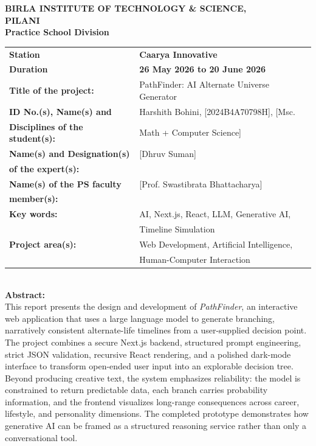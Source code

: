 \documentclass[12pt,a4paper]{report}
\begin{document}
\newpage
\begin{center}
    {\large \textbf{BIRLA INSTITUTE OF TECHNOLOGY \& SCIENCE,}}\\
    {\large \textbf{PILANI}}\\
    {\large \textbf{Practice School Division}}
\end{center}
\vspace{1cm}
\noindent
\begin{tabular}{@{}p{}p{}@{}}
\textbf{Station} & \textbf{Caarya Innovative} \\[0.5cm]
\textbf{Duration} & \textbf{26 May 2026 to 20 June 2026} \\[0.5cm]
\textbf{Title of the project:} & PathFinder: AI Alternate Universe Generator \\[0.5cm]
\textbf{ID No.(s), Name(s) and} & Harshith Bohini, [2024B4A70798H], [Msc. \\
\textbf{Disciplines of the student(s):} & Math + Computer Science] \\[0.5cm]
\textbf{Name(s) and Designation(s)} & [Dhruv Suman] \\
\textbf{of the expert(s):} & \\[0.5cm]
\textbf{Name(s) of the PS faculty} & [Prof. Swastibrata Bhattacharya] \\
\textbf{member(s):} & \\[0.5cm]
\textbf{Key words:} & AI, Next.js, React, LLM, Generative AI, \\
& Timeline Simulation \\[0.5cm]
\textbf{Project area(s):} & Web Development, Artificial Intelligence, \\
& Human-Computer Interaction \\[0.5cm]
\end{tabular}\\[0.5cm]
\textbf{Abstract:}\\
This report presents the design and development of \textit{PathFinder}, an interactive web application that uses a large language model to generate branching, narratively consistent alternate-life timelines from a user-supplied decision point. The project combines a secure Next.js backend, structured prompt engineering, strict JSON validation, recursive React rendering, and a polished dark-mode interface to transform open-ended user input into an explorable decision tree. Beyond producing creative text, the system emphasizes reliability: the model is constrained to return predictable data, each branch carries probability information, and the frontend visualizes long-range consequences across career, lifestyle, and personality dimensions. The completed prototype demonstrates how generative AI can be framed as a structured reasoning service rather than only a conversational tool.
\vspace{1.5cm}
\end{document}
